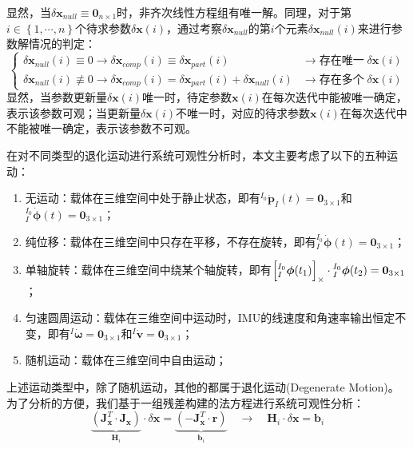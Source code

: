 显然，当$\delta\boldsymbol{x}_{null}
  \equiv\boldsymbol{0}_{n\times 1}$时，非齐次线性方程组有唯一解。同理，对于第$i\in\left\lbrace 1,\cdots,n\right\rbrace $个待求参数$\delta\boldsymbol{x}(i)$，通过考察$\delta\boldsymbol{x}_{null}$的第$i$个元素$\delta\boldsymbol{x}_{null}(i)$来进行参数解情况的判定：
\begin{equation}
  \begin{cases}
    \delta\boldsymbol{x}_{null}(i)\equiv 0\to \delta\boldsymbol{x}_{comp}(i)\equiv\delta\boldsymbol{x}_{part}(i)                              & \to\mbox{存在唯一}\;\delta\boldsymbol{x}(i) \\
    \delta\boldsymbol{x}_{null}(i)\not\equiv 0\to\delta\boldsymbol{x}_{comp}(i)=\delta\boldsymbol{x}_{part}(i)+\delta\boldsymbol{x}_{null}(i) & \to\mbox{存在多个}\;\delta\boldsymbol{x}(i)
  \end{cases}
\end{equation}
显然，当参数更新量$\delta\boldsymbol{x}(i)$唯一时，待定参数$\boldsymbol{x}(i)$在每次迭代中能被唯一确定，表示该参数可观；当更新量$\delta\boldsymbol{x}(i)$不唯一时，对应的待求参数$\boldsymbol{x}(i)$在每次迭代中不能被唯一确定，表示该参数不可观。

在对不同类型的退化运动进行系统可观性分析时，本文主要考虑了以下的五种运动：
\begin{enumerate}
  \item 无运动：载体在三维空间中处于静止状态，即有${^{I_0}\dot{\boldsymbol{p}}_{I}(t)}=\boldsymbol{0}_{3\times 1}$和${^{I_0}_{I}\dot{\boldsymbol{\phi}}(t)}=\boldsymbol{0}_{3\times 1}$；
  \item 纯位移：载体在三维空间中只存在平移，不存在旋转，即有${^{I_0}_{I}\dot{\boldsymbol{\phi}}(t)}=\boldsymbol{0}_{3\times 1}$；
  \item 单轴旋转：载体在三维空间中绕某个轴旋转，即有$\left[ {^{I_0}_{I}{\boldsymbol{\phi}}(t_1)} \right]_\times\cdot{^{I_0}_{I}{\boldsymbol{\phi}}(t_2)}=\boldsymbol{0}_{3\times 1}$；
  \item 匀速圆周运动：载体在三维空间中运动时，IMU的线速度和角速率输出恒定不变，即有${^{I}\dot{\boldsymbol{\omega}}}=\boldsymbol{0}_{3\times 1}$和${^{I}\dot{\boldsymbol{v}}}=\boldsymbol{0}_{3\times 1}$；
  \item 随机运动：载体在三维空间中自由运动；
\end{enumerate}
上述运动类型中，除了随机运动，其他的都属于退化运动(Degenerate Motion)。为了分析的方便，我们基于一组残差构建的法方程进行系统可观性分析：
\begin{equation}
  \underbrace{\left(
    \boldsymbol{J}_{\boldsymbol{x}}^T\cdot\boldsymbol{J}_{\boldsymbol{x}}
    \right)}_{\boldsymbol{H}_i}
  \cdot\delta\boldsymbol{x}=
  \underbrace{\left( - \boldsymbol{J}_{\boldsymbol{x}}^T\cdot\boldsymbol{r}\right)}
  _{\boldsymbol{b}_i}
  \quad\to\quad
  \boldsymbol{H}_i\cdot\delta\boldsymbol{x}=\boldsymbol{b}_i
\end{equation}

